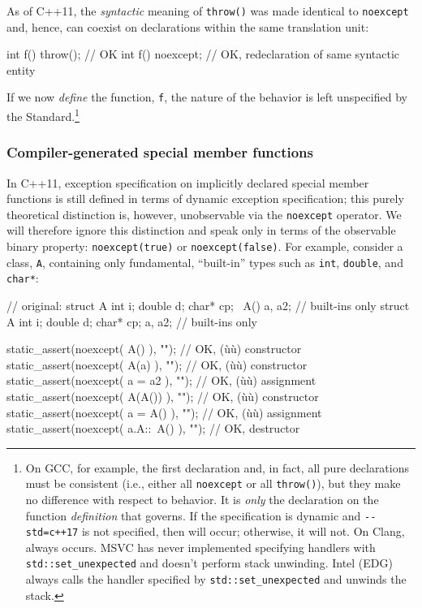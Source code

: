 \noindent As of C++11, the \emph{syntactic} meaning of \lstinline!throw()! was made
identical to \lstinline!noexcept! and, hence, can coexist on declarations
within the same translation unit:

\begin{emcppslisting}
int f() throw();    // OK
int f() noexcept;   // OK, redeclaration of same syntactic entity
\end{emcppslisting}
    

\noindent If we now \emph{define} the function, \lstinline!f!, the nature of the
 behavior is left unspecified by the
Standard.{\cprotect\footnote{On GCC, for example, the first declaration
and, in fact, all pure declarations must be consistent (i.e., either
all \lstinline!noexcept! or all \lstinline!throw()!), but they make no
difference with respect to behavior. It is \emph{only} the declaration
on the function \emph{definition} that governs. If the specification
is dynamic and \lstinline!--std=c++17! is not specified, then
 will occur; otherwise, it will not. On Clang,
 always occurs. MSVC has never implemented
specifying handlers with \lstinline!std::set_unexpected! and doesn't
perform stack unwinding. Intel (EDG) always calls the handler
  specified by \lstinline!std::set_unexpected! and unwinds the stack.}}

\subsubsection[Compiler-generated special member functions]{Compiler-generated special member functions}\label{compiler-generated-special-member-functions}

In C++11, exception specification on implicitly declared special member
functions is still defined in terms of dynamic exception specification;
this purely theoretical distinction is, however, unobservable via the
\lstinline!noexcept! operator. We will therefore ignore this distinction
and speak only in terms of the observable binary property:
\lstinline!noexcept(true)! or \lstinline!noexcept(false)!. For example,
consider a class, \lstinline!A!, containing only fundamental, ``built-in''
types such as \lstinline!int!, \lstinline!double!, and \lstinline!char*!:

\begin{emcppslisting}
// original: struct A { int i; double d; char* cp; ~A() } a, a2;  // built-ins only
struct A { int i; double d; char* cp; } a, a2;  // built-ins only

static_assert(noexcept( A()       ), "");  // OK, (ù{}ù) constructor
static_assert(noexcept( A(a)      ), "");  // OK, (ù{}ù) constructor
static_assert(noexcept( a = a2    ), "");  // OK, (ù{}ù) assignment
static_assert(noexcept( A(A())    ), "");  // OK, (ù{}ù) constructor
static_assert(noexcept( a = A()   ), "");  // OK, (ù{}ù) assignment
static_assert(noexcept( a.A::~A() ), "");  // OK, destructor
\end{emcppslisting}
    


